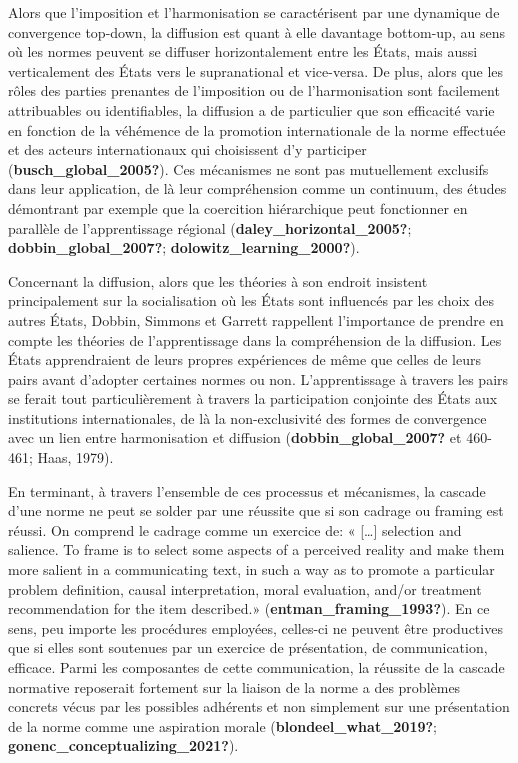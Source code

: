 \documentclass[12pt]{ulaval}
\begin{document}
Alors que l'imposition et l'harmonisation se caractérisent par une dynamique de convergence top-down, la diffusion est quant à elle davantage bottom-up, au sens où les normes peuvent se diffuser horizontalement entre les États, mais aussi verticalement des États vers le supranational et vice-versa. De plus, alors que les rôles des parties prenantes de l'imposition ou de l'harmonisation sont facilement attribuables ou identifiables, la diffusion a de particulier que son efficacité varie en fonction de la véhémence de la promotion internationale de la norme effectuée et des acteurs internationaux qui choisissent d'y participer (\textbf{busch\_global\_2005?}). Ces mécanismes ne sont pas mutuellement exclusifs dans leur application, de là leur compréhension comme un continuum, des études démontrant par exemple que la coercition hiérarchique peut fonctionner en parallèle de l'apprentissage régional (\textbf{daley\_horizontal\_2005?}; \textbf{dobbin\_global\_2007?}; \textbf{dolowitz\_learning\_2000?}).

Concernant la diffusion, alors que les théories à son endroit insistent principalement sur la socialisation où les États sont influencés par les choix des autres États, Dobbin, Simmons et Garrett rappellent l'importance de prendre en compte les théories de l'apprentissage dans la compréhension de la diffusion. Les États apprendraient de leurs propres expériences de même que celles de leurs pairs avant d'adopter certaines normes ou non. L'apprentissage à travers les pairs se ferait tout particulièrement à travers la participation conjointe des États aux institutions internationales, de là la non-exclusivité des formes de convergence avec un lien entre harmonisation et diffusion (\textbf{dobbin\_global\_2007?} et 460-461; Haas, 1979).

En terminant, à travers l'ensemble de ces processus et mécanismes, la cascade d'une norme ne peut se solder par une réussite que si son cadrage ou framing est réussi. On comprend le cadrage comme un exercice de: « {[}\ldots{]} selection and salience. To frame is to select some aspects of a perceived reality and make them more salient in a communicating text, in such a way as to promote a particular problem definition, causal interpretation, moral evaluation, and/or treatment recommendation for the item described.» (\textbf{entman\_framing\_1993?}). En ce sens, peu importe les procédures employées, celles-ci ne peuvent être productives que si elles sont soutenues par un exercice de présentation, de communication, efficace. Parmi les composantes de cette communication, la réussite de la cascade normative reposerait fortement sur la liaison de la norme a des problèmes concrets vécus par les possibles adhérents et non simplement sur une présentation de la norme comme une aspiration morale (\textbf{blondeel\_what\_2019?}; \textbf{gonenc\_conceptualizing\_2021?}).
\end{document}
